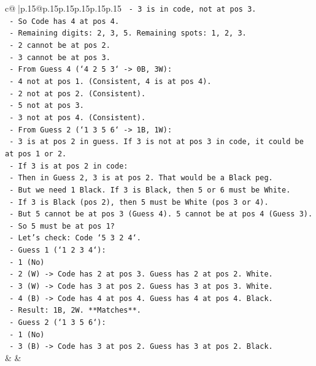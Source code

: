 \documentclass{article}
\begin{document}
{\begin{supertabular}{c@{$\;$}|p{.15\linewidth}@{}p{.15\linewidth}p{.15\linewidth}p{.15\linewidth}p{.15\linewidth}p{.15\linewidth}}
{{{\texttt{        {-}   3 is in code, not at pos 3.} \\
\texttt{    {-}   So Code has 4 at pos 4.} \\
\texttt{    {-}   Remaining digits: 2, 3, 5. Remaining spots: 1, 2, 3.} \\
\texttt{    {-}   2 cannot be at pos 2.} \\
\texttt{    {-}   3 cannot be at pos 3.} \\
\texttt{    {-}   From Guess 4 (`4 2 5 3` {-}> 0B, 3W):} \\
\texttt{        {-}   4 not at pos 1. (Consistent, 4 is at pos 4).} \\
\texttt{        {-}   2 not at pos 2. (Consistent).} \\
\texttt{        {-}   5 not at pos 3.} \\
\texttt{        {-}   3 not at pos 4. (Consistent).} \\
\texttt{    {-}   From Guess 2 (`1 3 5 6` {-}> 1B, 1W):} \\
\texttt{        {-}   3 is at pos 2 in guess. If 3 is not at pos 3 in code, it could be at pos 1 or 2.} \\
\texttt{        {-}   If 3 is at pos 2 in code:} \\
\texttt{            {-}   Then in Guess 2, 3 is at pos 2. That would be a Black peg.} \\
\texttt{            {-}   But we need 1 Black. If 3 is Black, then 5 or 6 must be White.} \\
\texttt{            {-}   If 3 is Black (pos 2), then 5 must be White (pos 3 or 4).} \\
\texttt{            {-}   But 5 cannot be at pos 3 (Guess 4). 5 cannot be at pos 4 (Guess 3).} \\
\texttt{            {-}   So 5 must be at pos 1?} \\
\texttt{            {-}   Let's check: Code `5 3 2 4`.} \\
\texttt{                {-}   Guess 1 (`1 2 3 4`):} \\
\texttt{                    {-}   1 (No)} \\
\texttt{                    {-}   2 (W) {-}> Code has 2 at pos 3. Guess has 2 at pos 2. White.} \\
\texttt{                    {-}   3 (W) {-}> Code has 3 at pos 2. Guess has 3 at pos 3. White.} \\
\texttt{                    {-}   4 (B) {-}> Code has 4 at pos 4. Guess has 4 at pos 4. Black.} \\
\texttt{                    {-}   Result: 1B, 2W. **Matches**.} \\
\texttt{                {-}   Guess 2 (`1 3 5 6`):} \\
\texttt{                    {-}   1 (No)} \\
\texttt{                    {-}   3 (B) {-}> Code has 3 at pos 2. Guess has 3 at pos 2. Black.} \\
            }
        }
    }
    & & \\ \\


\end{supertabular}}
\end{document}

